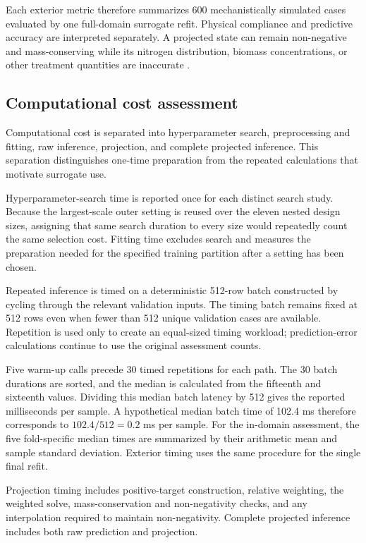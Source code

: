 Each exterior metric therefore summarizes 600 mechanistically simulated cases evaluated by one full-domain surrogate refit. Physical compliance and predictive accuracy are interpreted separately. A projected state can remain non-negative and mass-conserving while its nitrogen distribution, biomass concentrations, or other treatment quantities are inaccurate \citep{Henze2006,Selerio2026}.

\subsection{Computational cost assessment}

Computational cost is separated into hyperparameter search, preprocessing and fitting, raw inference, projection, and complete projected inference. This separation distinguishes one-time preparation from the repeated calculations that motivate surrogate use.

Hyperparameter-search time is reported once for each distinct search study. Because the largest-scale outer setting is reused over the eleven nested design sizes, assigning that same search duration to every size would repeatedly count the same selection cost. Fitting time excludes search and measures the preparation needed for the specified training partition after a setting has been chosen.

Repeated inference is timed on a deterministic 512-row batch constructed by cycling through the relevant validation inputs. The timing batch remains fixed at 512 rows even when fewer than 512 unique validation cases are available. Repetition is used only to create an equal-sized timing workload; prediction-error calculations continue to use the original assessment counts.

Five warm-up calls precede 30 timed repetitions for each path. The 30 batch durations are sorted, and the median is calculated from the fifteenth and sixteenth values. Dividing this median batch latency by 512 gives the reported milliseconds per sample. A hypothetical median batch time of 102.4 ms therefore corresponds to
$102.4/512=0.2$
ms per sample. For the in-domain assessment, the five fold-specific median times are summarized by their arithmetic mean and sample standard deviation. Exterior timing uses the same procedure for the single final refit.

Projection timing includes positive-target construction, relative weighting, the weighted solve, mass-conservation and non-negativity checks, and any interpolation required to maintain non-negativity. Complete projected inference includes both raw prediction and projection.


